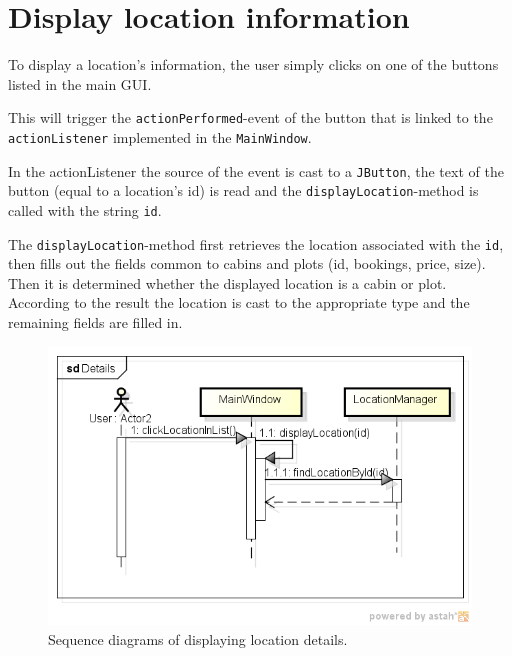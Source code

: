 \section{Display location information}
\label{sec:location_information}

To display a location's information, the user simply clicks on one of the buttons listed in the main \ac{GUI}.

This will trigger the \texttt{actionPerformed}-event of the button that is linked to the \texttt{actionListener} implemented in the \texttt{MainWindow}.

In the actionListener the source of the event is cast to a \texttt{JButton}, the text of the button (equal to a location's id) is read and the \texttt{displayLocation}-method is called with the string \texttt{id}.

The \texttt{displayLocation}-method first retrieves the location associated with the \texttt{id}, then fills out the fields common to cabins and plots (id, bookings, price, size). Then it is determined whether the displayed location is a cabin or plot. According to the result the location is cast to the appropriate type and the remaining fields are filled in.

\begin{figure}[H]
\begin{center}
\includegraphics[width=\textwidth]{gfx/details_sequence.png} 
\end{center}
\caption{Sequence diagrams of displaying location details.}
\label{fig:details_sequence}
\end{figure}

